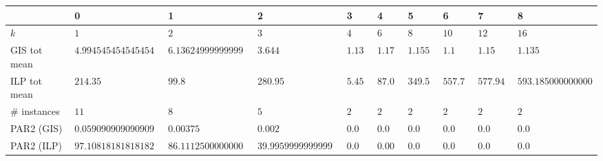 \begin{tabular}{llllllllll}
\toprule
{} &                      0 &                     1 &                     2 &        3 &        4 &         5 &         6 &          7 &                    8 \\
\midrule
$k$          &                    $1$ &                   $2$ &                   $3$ &      $4$ &      $6$ &       $8$ &      $10$ &       $12$ &                 $16$ \\
GIS tot mean &    $4.994545454545454$ &  $6.1362499999999995$ &               $3.644$ &  $1.135$ &   $1.17$ &   $1.155$ &     $1.1$ &     $1.15$ &              $1.135$ \\
ILP tot mean &               $214.35$ &                $99.8$ &              $280.95$ &   $5.45$ &   $87.0$ &  $349.56$ &  $557.71$ &  $577.945$ &  $593.1850000000001$ \\
\# instances &                   $11$ &                   $8$ &                   $5$ &      $2$ &      $2$ &       $2$ &       $2$ &        $2$ &                  $2$ \\
PAR2 (GIS)   &  $0.05909090909090909$ &             $0.00375$ &               $0.002$ &    $0.0$ &    $0.0$ &     $0.0$ &     $0.0$ &      $0.0$ &                $0.0$ \\
PAR2 (ILP)   &    $97.10818181818182$ &   $86.11125000000001$ &  $39.995999999999995$ &    $0.0$ &  $0.005$ &     $0.0$ &     $0.0$ &      $0.0$ &                $0.0$ \\
\bottomrule
\end{tabular}
